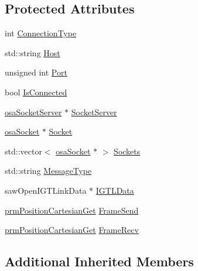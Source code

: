 \subsection*{Protected Attributes}
\begin{DoxyCompactItemize}
\item 
int \hyperlink{classmts_open_i_g_t_link_a62845fdde2c3186db262a28c1ef7ee85}{Connection\-Type}
\item 
std\-::string \hyperlink{classmts_open_i_g_t_link_aa416769aea8ba2074b1fa352c150facb}{Host}
\item 
unsigned int \hyperlink{classmts_open_i_g_t_link_a2e29caf8f3e7452f26f6908d17386ee1}{Port}
\item 
bool \hyperlink{classmts_open_i_g_t_link_abd2384165d5e4045215e695975780eef}{Is\-Connected}
\item 
\hyperlink{classosa_socket_server}{osa\-Socket\-Server} $\ast$ \hyperlink{classmts_open_i_g_t_link_adc1f9d5e4dbc18d71552a41d17940893}{Socket\-Server}
\item 
\hyperlink{classosa_socket}{osa\-Socket} $\ast$ \hyperlink{classmts_open_i_g_t_link_a92517a30507bb0c5f2717084bf6fcd01}{Socket}
\item 
std\-::vector$<$ \hyperlink{classosa_socket}{osa\-Socket} $\ast$ $>$ \hyperlink{classmts_open_i_g_t_link_ac8e7ec9abbd6cb65bbe6a45dd3c4ed80}{Sockets}
\item 
std\-::string \hyperlink{classmts_open_i_g_t_link_a093697b394242318dc24586d22b9a7d1}{Message\-Type}
\item 
saw\-Open\-I\-G\-T\-Link\-Data $\ast$ \hyperlink{classmts_open_i_g_t_link_a6ea66218c525d89e6ca0a5234d252078}{I\-G\-T\-L\-Data}
\item 
\hyperlink{classprm_position_cartesian_get}{prm\-Position\-Cartesian\-Get} \hyperlink{classmts_open_i_g_t_link_a97da17fac3c8d91dcd09005f06ded93a}{Frame\-Send}
\item 
\hyperlink{classprm_position_cartesian_get}{prm\-Position\-Cartesian\-Get} \hyperlink{classmts_open_i_g_t_link_aac470cfdb42709fbdb6d9228991204e2}{Frame\-Recv}
\end{DoxyCompactItemize}
\subsection*{Additional Inherited Members}


